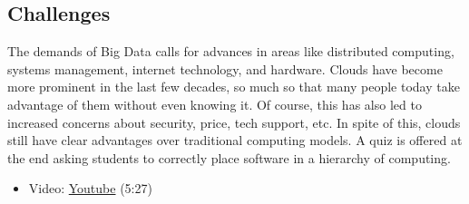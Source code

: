 \subsection{Challenges}\label{challenges}

The demands of Big Data calls for advances in areas like distributed
computing, systems management, internet technology, and hardware. Clouds
have become more prominent in the last few decades, so much so that many
people today take advantage of them without even knowing it. Of course,
this has also led to increased concerns about security, price, tech
support, etc. In spite of this, clouds still have clear advantages over
traditional computing models. A quiz is offered at the end asking
students to correctly place software in a hierarchy of computing.

\begin{itemize}
\tightlist
\item
  Video: \href{https://www.youtube.com/watch?v=VpDRGcBe4s8}{Youtube}
  (5:27)
\end{itemize}

